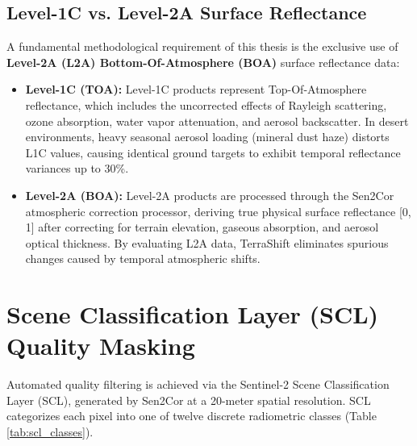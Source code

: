 \subsection{Level-1C vs. Level-2A Surface Reflectance}
A fundamental methodological requirement of this thesis is the exclusive use of \textbf{Level-2A (L2A) Bottom-Of-Atmosphere (BOA)} surface reflectance data:
\begin{itemize}
    \item \textbf{Level-1C (TOA):} Level-1C products represent Top-Of-Atmosphere reflectance, which includes the uncorrected effects of Rayleigh scattering, ozone absorption, water vapor attenuation, and aerosol backscatter. In desert environments, heavy seasonal aerosol loading (mineral dust haze) distorts L1C values, causing identical ground targets to exhibit temporal reflectance variances up to 30\%.
    \item \textbf{Level-2A (BOA):} Level-2A products are processed through the Sen2Cor atmospheric correction processor, deriving true physical surface reflectance [0, 1] after correcting for terrain elevation, gaseous absorption, and aerosol optical thickness. By evaluating L2A data, TerraShift eliminates spurious changes caused by temporal atmospheric shifts.
\end{itemize}

\section{Scene Classification Layer (SCL) Quality Masking}
\label{sec:data_scl}
Automated quality filtering is achieved via the Sentinel-2 Scene Classification Layer (SCL), generated by Sen2Cor at a 20-meter spatial resolution. SCL categorizes each pixel into one of twelve discrete radiometric classes (Table \ref{tab:scl_classes}).

